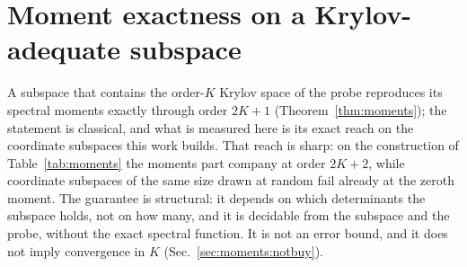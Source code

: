 %
%

\makeatletter
{}
\makeatother


\section{Moment exactness on a Krylov-adequate subspace}
\label{sec:moments}

A subspace that contains the order-$K$ Krylov space of the probe reproduces its spectral moments exactly
through order $2K+1$ (Theorem~\ref{thm:moments}); the statement is classical, and what is measured here
is its exact reach on the coordinate subspaces this work builds. That reach is sharp: on the construction
of Table~\ref{tab:moments} the moments part company at order $2K+2$, while coordinate subspaces of the
same size drawn at random fail already at the zeroth moment. The guarantee is structural: it depends on
which determinants the subspace holds, not on how many, and it is decidable from the subspace and the probe,
without the exact spectral function. It is not an error bound, and it does not imply convergence in $K$
(Sec.~\ref{sec:moments:notbuy}).

